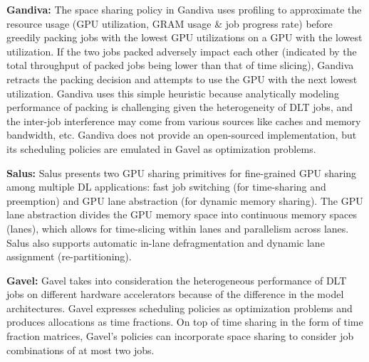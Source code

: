 \documentclass{article}
\begin{document}
\textbf{Gandiva:} The space sharing policy in Gandiva \cite{gandiva} uses profiling to approximate the resource usage (GPU utilization, GRAM usage \& job progress rate) before greedily packing jobs with the lowest GPU utilizations on a GPU with the lowest utilization. If the two jobs packed adversely impact each other (indicated by the total throughput of packed jobs being lower than that of time slicing), Gandiva retracts the packing decision and attempts to use the GPU with the next lowest utilization. Gandiva uses this simple heuristic because analytically modeling performance of packing is challenging given the heterogeneity of DLT jobs, and the inter-job interference may come from various sources like caches and memory bandwidth, etc. Gandiva does not provide an open-sourced implementation, but its scheduling policies are emulated in Gavel as optimization problems.



\textbf{Salus:} Salus \cite{salus} presents two GPU sharing primitives for fine-grained GPU sharing among multiple DL applications: fast job switching (for time-sharing and preemption) and GPU lane abstraction (for dynamic memory sharing). The GPU lane abstraction divides the GPU memory space into continuous memory spaces  (lanes), which allows for time-slicing within lanes and parallelism across lanes. Salus also supports automatic in-lane defragmentation and dynamic lane assignment (re-partitioning).

\textbf{Gavel:} Gavel \cite{gavel} takes into consideration the heterogeneous performance of DLT jobs on different hardware accelerators because of the difference in the model architectures. Gavel expresses scheduling policies as optimization problems and produces allocations as time fractions. On top of time sharing in the form of time fraction matrices, Gavel's policies can incorporate space sharing to consider job combinations of at most two jobs.
\end{document}

